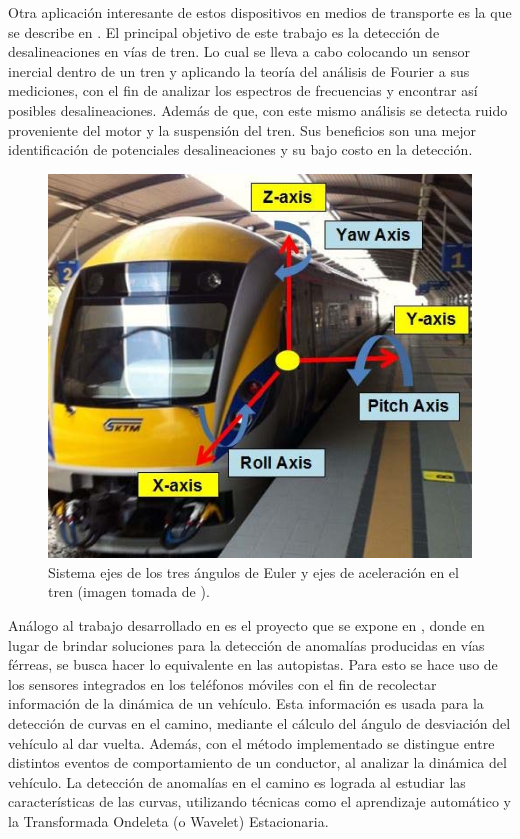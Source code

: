 Otra aplicación interesante de estos dispositivos en medios de transporte es la que se describe en \cite{7072991}. El principal objetivo de este trabajo es la detección de desalineaciones en vías de tren. 
Lo cual se lleva a cabo colocando un sensor inercial dentro de un tren y aplicando la teoría del análisis de Fourier a sus mediciones, con el fin de analizar los espectros de frecuencias y encontrar así posibles desalineaciones. 
Además de que, con este mismo análisis se detecta ruido proveniente del motor y la suspensión del tren. 
Sus beneficios son una mejor identificación de potenciales desalineaciones y su bajo costo en la detección. \\

\begin{figure}[H]
\centering
\includegraphics[scale=0.5]{4.png}
\caption{Sistema ejes de los tres ángulos de Euler y ejes de aceleración en el tren (imagen tomada de \cite{7072991}).}
\label{4}
\end{figure}

Análogo al trabajo desarrollado en \cite{7072991} es el proyecto que se expone en \cite{Seraj:2015:SBM:2800835.2800981}, donde en lugar de brindar soluciones para la detección de anomalías producidas en vías férreas, se busca hacer lo equivalente en las autopistas. 
Para esto se hace uso de los sensores integrados en los teléfonos móviles con el fin de recolectar información de la dinámica de un vehículo. 
Esta información es usada para la detección de curvas en el camino, mediante el cálculo del ángulo de desviación del vehículo al dar vuelta. 
Además, con el método implementado se distingue entre distintos eventos de comportamiento de un conductor, al analizar la dinámica del vehículo. 
La detección de anomalías en el camino es lograda al estudiar las características de las curvas, utilizando técnicas como el aprendizaje automático y la Transformada Ondeleta (o Wavelet) Estacionaria.

